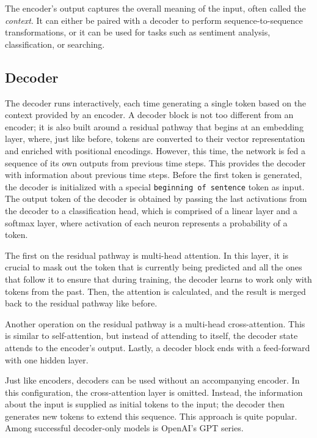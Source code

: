 The encoder's output captures the overall meaning of the input, often called the \emph{context}. It can either be paired with a decoder to perform sequence-to-sequence transformations, or it can be used for tasks such as sentiment analysis, classification, or searching.

\medskip

\subsection{Decoder}
The decoder runs interactively, each time generating a single token based on the context provided by an encoder.
A decoder block is not too different from an encoder; it is also built around a residual pathway that begins at an embedding layer, where, just like before, tokens are converted to their vector representation and enriched with positional encodings. However, this time, the network is fed a sequence of its own outputs from previous time steps. This provides the decoder with information about previous time steps. Before the first token is generated, the decoder is initialized with a special \texttt{beginning of sentence} token as input.
The output token of the decoder is obtained by passing the last activations from the decoder to a classification head, which is comprised of a linear layer and a softmax layer, where activation of each neuron represents a probability of a token.

The first on the residual pathway is multi-head attention. In this layer, it is crucial to mask out the token that is currently being predicted and all the ones that follow it to ensure that during training, the decoder learns to work only with tokens from the past. Then, the attention is calculated, and the result is merged back to the residual pathway like before.

Another operation on the residual pathway is a multi-head cross-attention. This is similar to self-attention, but instead of attending to itself, the decoder state attends to the encoder's output. Lastly, a decoder block ends with a feed-forward with one hidden layer.

Just like encoders, decoders can be used without an accompanying encoder. In this configuration, the cross-attention layer is omitted. Instead, the information about the input is supplied as initial tokens to the input; the decoder then generates new tokens to extend this sequence. This approach is quite popular. Among successful decoder-only models is OpenAI's GPT series.

